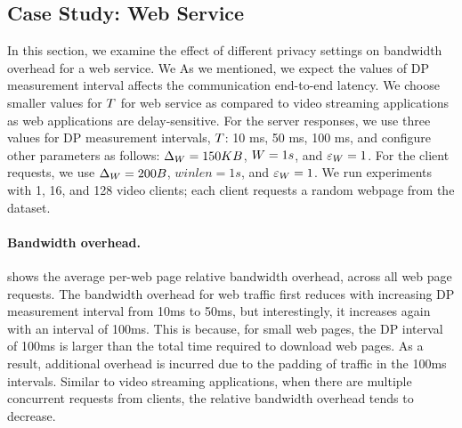 \subsection{Case Study: Web Service}\label{subsec:eval-bw-web}
In this section, we examine the effect of different privacy settings on bandwidth overhead for a web service.
We   
As we mentioned, we expect the values of DP measurement interval affects the communication end-to-end latency.
We choose smaller values for $T$ for web service as compared to video streaming applications as web applications are delay-sensitive.
For the server responses, we use three values for DP measurement intervals, $T$: 10 ms, 50 ms, 100 ms, and configure other parameters as follows: $\Delta_{W} = 150 KB$, $W = 1s$, and
$\varepsilon_{W} = 1$.
For the client requests, we use $\Delta_{W} = 200 B$, $winlen = 1s$, and $\varepsilon_{W} = 1$.
We run experiments with 1, 16, and 128 video clients; each client requests a random webpage from the dataset.



\paragraph{Bandwidth overhead.}
 shows the average per-web page relative bandwidth overhead, across all web page requests.
The bandwidth overhead for web traffic first reduces with increasing DP measurement interval from 10ms to 50ms, but interestingly, it increases again
with an interval of 100ms.
This is because, for small web pages, the DP interval of 100ms is larger than the total time required to download web pages.
As a result, additional overhead is incurred due to the padding of traffic in the 100ms intervals.
Similar to video streaming applications, when there are multiple concurrent requests from clients, the relative bandwidth overhead tends to decrease.

